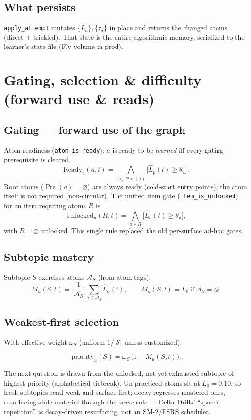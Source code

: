 \documentclass[11pt]{article}
\newcommand{\Lhat}{\hat{L}}
\newcommand{\Pre}{\operatorname{Pre}}
\begin{document}
\subsection{What persists}
\texttt{apply\_attempt} mutates $\{L_a\},\{\tau_a\}$ in place and returns the
changed atoms (direct $+$ trickled). That state is the entire algorithmic memory,
serialized to the learner's state file (Fly volume in prod).

\section{Gating, selection \& difficulty (forward use \& reads)}

\subsection{Gating --- forward use of the graph}
Atom readiness (\texttt{atom\_is\_ready}): $a$ is ready to be \emph{learned} iff
every gating prerequisite is cleared,
\[
  \mathrm{Ready}_u(a,t) = \bigwedge_{p\in\Pre(a)}\big[\Lhat_p(t)\ge\theta_{\mathrm{u}}\big].
\]
Root atoms ($\Pre(a)=\varnothing$) are always ready (cold-start entry points);
the atom itself is not required (non-circular). The unified item gate
(\texttt{item\_is\_unlocked}) for an item requiring atoms $R$ is
\[
  \mathrm{Unlocked}_u(R,t) = \bigwedge_{a\in R}\big[\Lhat_a(t)\ge\theta_{\mathrm{u}}\big],
\]
with $R=\varnothing$ unlocked. This single rule replaced the old per-surface
ad-hoc gates.

\subsection{Subtopic mastery}
Subtopic $S$ exercises atoms $\mathcal{A}_S$ (from atom tags):
\[
  M_u(S,t)=\frac{1}{|\mathcal{A}_S|}\sum_{a\in\mathcal{A}_S}\Lhat_a(t),
  \qquad M_u(S,t)=L_0\ \text{if}\ \mathcal{A}_S=\varnothing .
\]

\subsection{Weakest-first selection}
With effective weight $\omega_S$ (uniform $1/|\mathcal{S}|$ unless customized):
\begin{keybox}
\[
  \mathrm{priority}_u(S) = \omega_S\,\big(1 - M_u(S,t)\big).
\]
\end{keybox}
The next question is drawn from the unlocked, not-yet-exhausted subtopic of
highest priority (alphabetical tiebreak). Un-practiced atoms sit at
$L_0=0.10$, so fresh subtopics read weak and surface first; decay regresses
mastered ones, resurfacing stale material through the \emph{same} rule --- Delta
Drills' ``spaced repetition'' is decay-driven resurfacing, not an SM-2/FSRS
scheduler.
\end{document}
